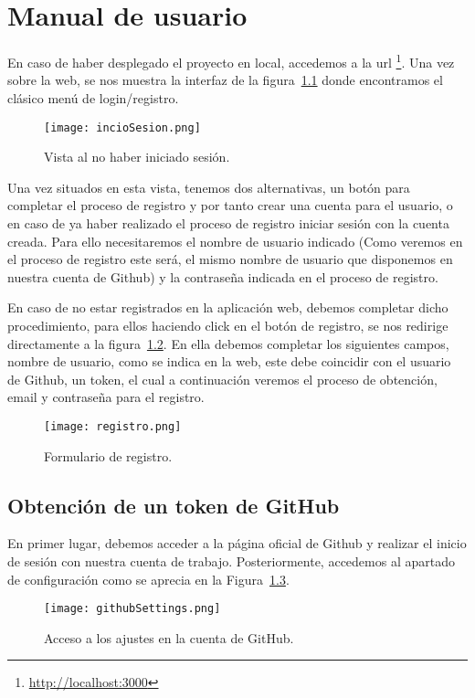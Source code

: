 \chapter{Manual de usuario\label{09manual}}

En caso de haber desplegado el proyecto en local, accedemos a la url \footnote{\url{http://localhost:3000}}.
Una vez sobre la web, se nos muestra la interfaz de la figura~\ref{figure:inicioSesion} donde encontramos el clásico menú de login/registro.

\begin{figure}[h!]
  \texttt{[image: incioSesion.png]}
  \caption{Vista al no haber iniciado sesión.}
  \label{figure:inicioSesion}
\end{figure}

Una vez situados en esta vista, tenemos dos alternativas, un botón para completar el proceso de registro y por tanto crear una cuenta para el usuario, o en caso de ya haber realizado el proceso de registro iniciar sesión con la cuenta creada. Para ello necesitaremos el nombre de usuario indicado (Como veremos en el proceso de registro este será, el mismo nombre de usuario que disponemos en nuestra cuenta de Github) y la contraseña indicada en el proceso de registro.


En caso de no estar registrados en la aplicación web, debemos completar dicho procedimiento, para ellos haciendo click en el botón de registro, se nos redirige directamente a la figura~\ref{figure:registro}. En ella debemos completar los siguientes campos, nombre de usuario, como se indica en la web, este debe coincidir con el usuario de Github, un token, el cual a continuación veremos el proceso de obtención, email y contraseña para el registro.

\begin{figure}[h!]
  \texttt{[image: registro.png]}
  \caption{Formulario de registro.}
  \label{figure:registro}
\end{figure}



\section{Obtención de un token de GitHub}

En primer lugar, debemos acceder a la página oficial de Github\cite{GitHub} y realizar el inicio de sesión con nuestra cuenta de trabajo. Posteriormente, accedemos al apartado de configuración como se aprecia en la Figura~\ref{figure:settingsGitHub}.
\begin{figure}[h!]
  \texttt{[image: githubSettings.png]}
  \caption{Acceso a los ajustes en la cuenta de GitHub.}
  \label{figure:settingsGitHub}
\end{figure}

